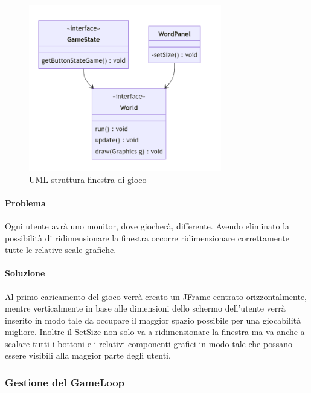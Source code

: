 \documentclass[a4paper,12pt]{report}
\begin{document}
\begin{figure}[H]
    \centering{}
    \includegraphics[width=0.75\textwidth]{img/UMLFinestraDiGioco.png}
    \caption{UML struttura finestra di gioco}
\end{figure}

\paragraph{Problema} Ogni utente avrà uno monitor, dove giocherà, differente. Avendo eliminato la possibilità di ridimensionare la finestra occorre ridimensionare correttamente tutte le relative scale grafiche.

\paragraph{Soluzione} Al primo caricamento del gioco verrà creato un JFrame centrato orizzontalmente, mentre verticalmente in base alle dimensioni dello schermo dell’utente verrà inserito in modo tale da occupare il maggior spazio possibile per una giocabilità migliore. Inoltre il SetSize non solo va a ridimensionare la finestra ma va anche a scalare tutti i bottoni e i relativi componenti grafici in modo tale che possano essere visibili alla maggior parte degli utenti.

\subsubsection{Gestione del GameLoop}
\end{document}
